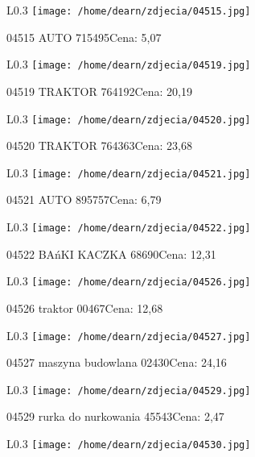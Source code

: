 \begin{wrapfigure}{L}{0.3\textwidth}
\texttt{[image: /home/dearn/zdjecia/04515.jpg]}
\end{wrapfigure}
04515 AUTO                                            715495Cena: 5,07\newline
\begin{wrapfigure}{L}{0.3\textwidth}
\texttt{[image: /home/dearn/zdjecia/04519.jpg]}
\end{wrapfigure}
04519 TRAKTOR                                         764192Cena: 20,19\newline
\begin{wrapfigure}{L}{0.3\textwidth}
\texttt{[image: /home/dearn/zdjecia/04520.jpg]}
\end{wrapfigure}
04520 TRAKTOR                                        764363Cena: 23,68\newline
\begin{wrapfigure}{L}{0.3\textwidth}
\texttt{[image: /home/dearn/zdjecia/04521.jpg]}
\end{wrapfigure}
04521 AUTO                                           895757Cena: 6,79\newline
\begin{wrapfigure}{L}{0.3\textwidth}
\texttt{[image: /home/dearn/zdjecia/04522.jpg]}
\end{wrapfigure}
04522 BAńKI KACZKA                                     68690Cena: 12,31\newline
\begin{wrapfigure}{L}{0.3\textwidth}
\texttt{[image: /home/dearn/zdjecia/04526.jpg]}
\end{wrapfigure}
04526 traktor 00467Cena: 12,68\newline
\begin{wrapfigure}{L}{0.3\textwidth}
\texttt{[image: /home/dearn/zdjecia/04527.jpg]}
\end{wrapfigure}
04527 maszyna budowlana 02430Cena: 24,16\newline
\begin{wrapfigure}{L}{0.3\textwidth}
\texttt{[image: /home/dearn/zdjecia/04529.jpg]}
\end{wrapfigure}
04529 rurka do nurkowania 45543Cena: 2,47\newline
\begin{wrapfigure}{L}{0.3\textwidth}
\texttt{[image: /home/dearn/zdjecia/04530.jpg]}
\end{wrapfigure}
